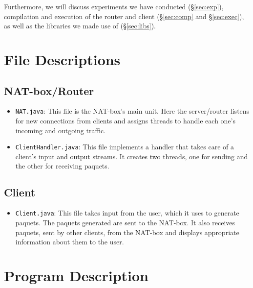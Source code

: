 \documentclass[10pt, a4paper]{article}
\begin{document}
Furthermore, we will discuss experiments we have conducted (\S\ref{sec:exp}),
compilation and execution of the router and client (\S\ref{sec:comp} and
\S\ref{sec:exec}), as well as the libraries we made use of (\S\ref{sec:libs}).



\section{File Descriptions}
\label{sec:fdesc}


\subsection{NAT-box/Router}
\label{ssec:natfdesc}

\begin{itemize}
  \item \texttt{NAT.java}: This file is the NAT-box's main unit. Here the
    server/router listens for new connections from clients and assigns threads
    to handle each one's incoming and outgoing traffic.
  \item \texttt{ClientHandler.java}: This file implements a handler that takes
    care of a client's input and output streams. It creates two threads, one for
    sending and the other for receiving paquets.
\end{itemize}


\subsection{Client}
\label{ssec:clifdesc}

\begin{itemize}
  \item \texttt{Client.java}: This file takes input from the user, which it uses
    to generate paquets. The paquets generated are sent to the NAT-box. It also
    receives paquets, sent by other clients, from the NAT-box and displays
    appropriate information about them to the user.
\end{itemize}


\section{Program Description}
\label{sec:pdesc}
\end{document}
